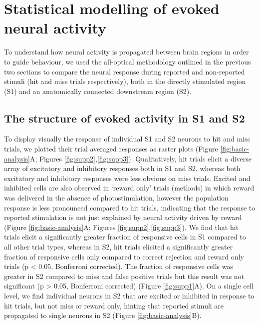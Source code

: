 \chapter{\label{res3}Statistical modelling of evoked neural activity
}

\minitoc

To understand how neural activity is propagated between brain regions in order to guide behaviour, we used the all-optical methodology outlined in the previous two sections to compare the neural response during reported and non-reported stimuli (hit and miss trials respectively), both in the directly stimulated region (S1) and an anatomically connected downstream region (S2). 

\section{The structure of evoked activity in S1 and S2}

To display visually the response of individual S1 and S2 neurons to hit and miss trials, we plotted their trial averaged responses as raster plots (Figure \ref{fig:basic-analysis}A; Figures \ref{fig:supp2},\ref{fig:supp3}). Qualitatively, hit trials elicit a diverse array of excitatory and inhibitory responses both in S1 and S2, whereas both excitatory and inhibitory responses were less obvious on miss trials. Excited and inhibited cells are also observed in ‘reward only’ trials (methods) in which reward was delivered in the absence of photostimulation, however the population response is less pronounced compared to hit trials, indicating that the response to reported stimulation is not just explained by neural activity driven by reward (Figure \ref{fig:basic-analysis}A; Figures \ref{fig:supp2},\ref{fig:supp3}). We find that hit trials elicit a significantly greater fraction of responsive cells in S1 compared to all other trial types, whereas in S2, hit trials elicited a significantly greater fraction of responsive cells only compared to correct rejection and reward only trials (p < 0.05, Bonferroni corrected). The fraction of responsive cells was greater in S2 compared to miss and false positive trials but this result was not significant (p > 0.05, Bonferroni corrected) (Figure \ref{fig:supp1}A). On a single cell level, we find individual neurons in S2 that are excited or inhibited in response to hit trials, but not miss or reward only, hinting that reported stimuli are propagated to single neurons in S2 (Figure \ref{fig:basic-analysis}B).

